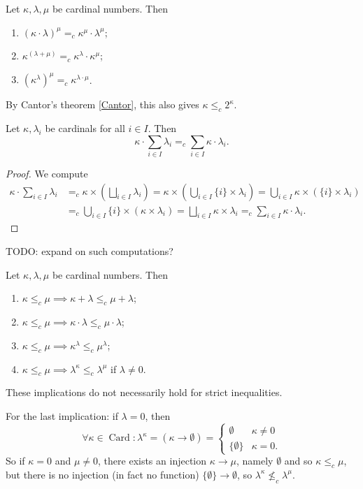 \begin{lemma}
Let $\kappa,\lambda, \mu$ be cardinal numbers. Then
\begin{enumerate}
\item $(\kappa\cdot\lambda)^\mu =_c \kappa^\mu\cdot\lambda^\mu$;
\item $\kappa^{(\lambda+\mu)} =_c \kappa^\lambda\cdot \kappa^\mu$;
\item $\left(\kappa^\lambda\right)^\mu =_c \kappa^{\lambda\cdot \mu}$.
\end{enumerate}
\end{lemma}
By Cantor's theorem \ref{Cantor}, this also gives $\kappa \leq_c 2^\kappa$.

\begin{lemma}
Let $\kappa,\lambda_i$ be cardinals for all $i\in I$. Then
\[ \kappa\cdot \sum_{i\in I}\lambda_i =_c \sum_{i\in I}\kappa\cdot \lambda_i. \]
\end{lemma}
\begin{proof}
We compute
\begin{align*}
\kappa\cdot \sum_{i\in I}\lambda_i &=_c \kappa\times\left(\bigsqcup_{i\in I}\lambda_i\right) = \kappa\times \left(\bigcup_{i\in I}\{i\}\times \lambda_i\right) = \bigcup_{i\in I}\kappa\times(\{i\}\times \lambda_i) \\
&=_c \bigcup_{i\in I}\{i\}\times(\kappa\times \lambda_i) = \bigsqcup_{i\in I}\kappa\times \lambda_i =_c \sum_{i\in I}\kappa\cdot \lambda_i.
\end{align*}
\end{proof}
TODO: expand on such computations?

\begin{lemma}
Let $\kappa,\lambda, \mu$ be cardinal numbers. Then
\begin{enumerate}
\item $\kappa\leq_c \mu \implies \kappa+\lambda \leq_c \mu+\lambda$;
\item $\kappa\leq_c \mu \implies \kappa\cdot\lambda \leq_c \mu\cdot\lambda$;
\item $\kappa\leq_c \mu \implies \kappa^\lambda \leq_c \mu^\lambda$;
\item $\kappa\leq_c \mu \implies \lambda^\kappa \leq_c \lambda^\mu$ if $\lambda\neq 0$.
\end{enumerate}
\end{lemma}
These implications do not necessarily hold for strict inequalities.

For the last implication: if $\lambda = 0$, then
\[ \forall \kappa \in \operatorname{Card}: \lambda^\kappa = (\kappa\to\emptyset) = \begin{cases}
\emptyset & \kappa \neq 0 \\
\{\emptyset\} & \kappa = 0.
\end{cases} \]
So if $\kappa = 0$ and $\mu\neq 0$, there exists an injection $\kappa\to\mu$, namely $\emptyset$ and so $\kappa\leq_c \mu$, but there is no injection (in fact no function) $\{\emptyset\}\to\emptyset$, so $\lambda^\kappa \nleq_c \lambda^\mu$.

